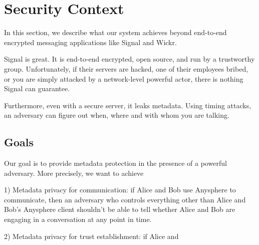 \section{Security Context}
\label{sec:securitycontext}


In this section, we describe what our system achieves beyond end-to-end encrypted messaging applications like Signal and Wickr.

Signal is great. It is end-to-end encrypted, open source, and run by a trustworthy group. Unfortunately, if their servers are hacked, one of their employees bribed, or you are simply attacked by a network-level powerful actor, there is nothing Signal can guarantee. 

Furthermore, even with a secure server, it leaks metadata. Using timing attacks, an adversary can figure out when, where and with whom you are talking. 
\subsection{Goals}

Our goal is to provide metadata protection in the presence of a powerful adversary. More precisely, we want to achieve

1) Metadata privacy for communication: if Alice and Bob use Anysphere to communicate, then an adversary who controls everything other than Alice and Bob's Anysphere client shouldn't be able to tell whether Alice and Bob are engaging in a conversation at any point in time.

2) Metadata privacy for trust establishment: if Alice and

